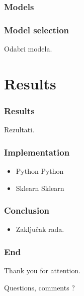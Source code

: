 \documentclass[slidestop,compress,11pt,xcolor=dvipsnames]{beamer}
\begin{document}
\begin{frame}
\centering
\frametitle{Models}

\end{frame}

\begin{frame}
\frametitle{Model selection}
\centerline{Odabri modela.}
\end{frame}

\section{Results}

\begin{frame}[fragile] %
\frametitle{Results}

\centerline{Rezultati.}
\end{frame}

\begin{frame}[fragile] %
\frametitle{Implementation}
\vspace{1cm}
\begin{itemize}
\setlength\itemsep{1em}
	\item Python Python
	\item Sklearn Sklearn

\end{itemize}


\end{frame}



\begin{frame}
\frametitle{Conclusion}
\vspace{1.25cm}
\begin{itemize}
\setlength\itemsep{1em}
	\item Zaključak rada. 
\end{itemize}
\end{frame}


\begin{frame}
\vspace{1.25cm}
\frametitle{End}
\centerline{Thank you for attention.}
\vspace{0.5cm}
\centerline{Questions, comments ?}
\end{frame}

\end{document}
